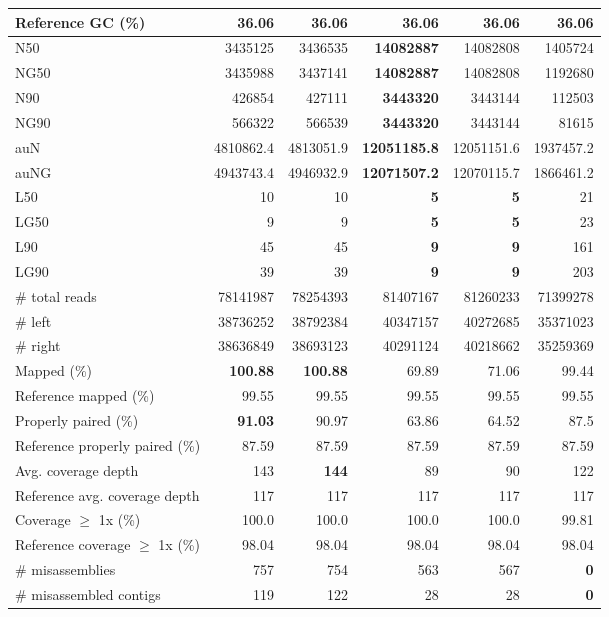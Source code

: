 \documentclass[12pt,a4paper]{article}
\begin{document}
\begin{table}[ht]
\begin{center}
\begin{tabular}{|l*{5}{|r}|}
Reference GC (\%) & 36.06 & 36.06 & 36.06 & 36.06 & 36.06 \\ \hline
N50 & 3435125 & 3436535 & {\bf 14082887} & 14082808 & 1405724 \\ \hline
NG50 & 3435988 & 3437141 & {\bf 14082887} & 14082808 & 1192680 \\ \hline
N90 & 426854 & 427111 & {\bf 3443320} & 3443144 & 112503 \\ \hline
NG90 & 566322 & 566539 & {\bf 3443320} & 3443144 & 81615 \\ \hline
auN & 4810862.4 & 4813051.9 & {\bf 12051185.8} & 12051151.6 & 1937457.2 \\ \hline
auNG & 4943743.4 & 4946932.9 & {\bf 12071507.2} & 12070115.7 & 1866461.2 \\ \hline
L50 & 10 & 10 & {\bf 5} & {\bf 5} & 21 \\ \hline
LG50 & 9 & 9 & {\bf 5} & {\bf 5} & 23 \\ \hline
L90 & 45 & 45 & {\bf 9} & {\bf 9} & 161 \\ \hline
LG90 & 39 & 39 & {\bf 9} & {\bf 9} & 203 \\ \hline
\# total reads & 78141987 & 78254393 & 81407167 & 81260233 & 71399278 \\ \hline
\# left & 38736252 & 38792384 & 40347157 & 40272685 & 35371023 \\ \hline
\# right & 38636849 & 38693123 & 40291124 & 40218662 & 35259369 \\ \hline
Mapped (\%) & {\bf 100.88} & {\bf 100.88} & 69.89 & 71.06 & 99.44 \\ \hline
Reference mapped (\%) & 99.55 & 99.55 & 99.55 & 99.55 & 99.55 \\ \hline
Properly paired (\%) & {\bf 91.03} & 90.97 & 63.86 & 64.52 & 87.5 \\ \hline
Reference properly paired (\%) & 87.59 & 87.59 & 87.59 & 87.59 & 87.59 \\ \hline
Avg. coverage depth & 143 & {\bf 144} & 89 & 90 & 122 \\ \hline
Reference avg. coverage depth & 117 & 117 & 117 & 117 & 117 \\ \hline
Coverage $\geq$ 1x (\%) & 100.0 & 100.0 & 100.0 & 100.0 & 99.81 \\ \hline
Reference coverage $\geq$ 1x (\%) & 98.04 & 98.04 & 98.04 & 98.04 & 98.04 \\ \hline
\# misassemblies & 757 & 754 & 563 & 567 & {\bf 0} \\ \hline
\# misassembled contigs & 119 & 122 & 28 & 28 & {\bf 0} \\ \hline

\end{tabular}
\end{center}
\end{table}
\end{document}
